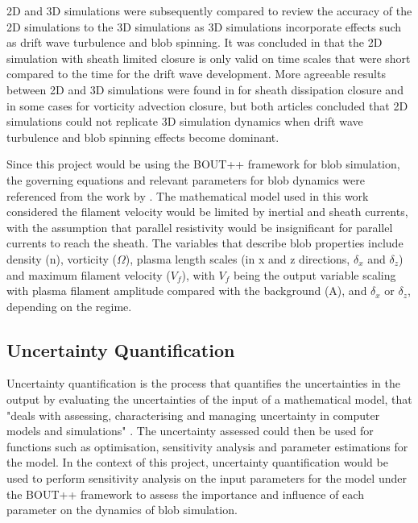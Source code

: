\documentclass{article}
\begin{document}
2D and 3D simulations were subsequently compared to review the accuracy of the 2D simulations to the 3D simulations as 3D simulations incorporate effects such as drift wave turbulence and blob spinning. It was concluded in \cite{angus_3d_2012}that the 2D simulation with sheath limited closure is only valid on time scales that were short compared to the time for the drift wave development. More agreeable results between 2D and 3D simulations were found in \cite{easy_three_2014} for sheath dissipation closure and in some cases for vorticity advection closure, but both articles concluded that 2D simulations could not replicate 3D simulation dynamics when drift wave turbulence and blob spinning effects become dominant.

Since this project would be using the BOUT++ framework \cite{dudson_bout_2009} for blob simulation, the governing equations and relevant parameters for blob dynamics were referenced from the work by \cite{omotani_effects_2015}. The mathematical model used in this work considered the filament velocity would be limited by inertial and sheath currents, with the assumption that parallel resistivity would be insignificant for parallel currents to reach the sheath. The variables that describe blob properties include density (n), vorticity ($\Omega$), plasma length scales (in x and z directions, $\delta_x$ and $\delta_z$) and maximum filament velocity ($V_f$), with $V_f$ being the output variable scaling with plasma filament amplitude compared with the background (A), and $\delta_x$ or $\delta_z$, depending on the regime.  

\subsection*{Uncertainty Quantification}
Uncertainty quantification is the process that quantifies the uncertainties in the output by evaluating the uncertainties of the input of a mathematical model, that "deals with assessing, characterising and managing uncertainty in computer models and simulations" \cite{wu_chapter_2024,li_gaussian_2025}. The uncertainty assessed could then be used for functions such as optimisation, sensitivity analysis and parameter estimations for the model. In the context of this project, uncertainty quantification would be used to perform sensitivity analysis on the input parameters for the model under the BOUT++ framework to assess the importance and influence of each parameter on the dynamics of blob simulation.
\end{document}
